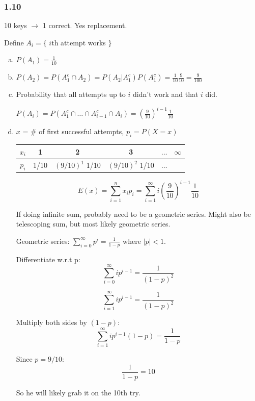 \documentclass{article}
\begin{document}
\subsubsection*{1.10}


10 keys $\rightarrow$ 1 correct. Yes replacement.

Define $A_i = \{ $ $i$th attempt works $\}$

\begin{enumerate}[(a)]
\item $P(A_1) = \frac{1}{10}$
\item $P(A_2) = P(A_1^c \cap A_2) = P(A_2|A_1^c) P(A_1^c) = \frac{1}{10} \frac{9}{10} = \frac{9}{100}$


\item Probability that all attempts up to $i$ didn't work and that $i$ did. 

$P(A_i) = P(A_1^c \cap \dots \cap A_{i-1}^c \cap A_i) = (\frac{9}{10})^{i-1} \frac{1}{10}$

\item  $x$ = \# of first successful attempts, $p_i = P(X = x)$

\begin{table}[H]
\centering
\begin{tabular}{c|ccccc}
\toprule
$x_i$ & 1 & 2 & 3 & $\dots$ & $\infty$ \\
\midrule
$p_i$ & 1/10 & $(9/10)^1$ 1/10 & $(9/10)^2$ 1/10 & $\dots$ & \\
\bottomrule
\end{tabular}
\end{table}

$$
E(x) = \sum_{i=1}^n x_i p_i = \sum_{i=1}^{\infty} i \left(\frac{9}{10}\right)^{i-1} \frac{1}{10}
$$

If doing infinite sum, probably need to be a geometric series. Might also be telescoping sum, but most likely geometric series.

Geometric series: $\sum_{i=0}^{\infty} p^i = \frac{1}{1-p}$ where $|p|<1$.

Differentiate w.r.t p: $$\sum_{i=0}^{\infty} i p^{i-1} = \frac{1}{(1-p)^2} $$

 $$\sum_{i=1}^{\infty} i p^{i-1} = \frac{1}{(1-p)^2} $$

Multiply both sides by $(1-p)$:  $$\sum_{i=1}^{\infty} i p^{i-1} (1-p) = \frac{1}{1-p} $$

Since $p=9/10$: $$\frac{1}{1-p} = 10 $$

So he will likely grab it on the 10th try.


\end{enumerate}
\end{document}
